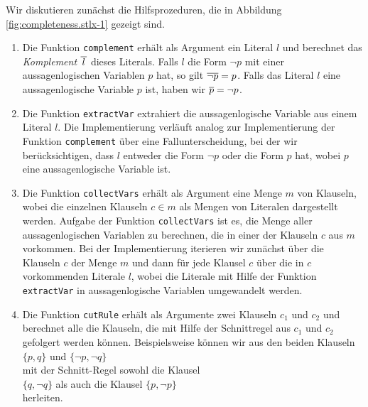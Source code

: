 Wir diskutieren zun\"{a}chst die Hilfsprozeduren, die in Abbildung \ref{fig:completeness.stlx-1} gezeigt
sind. 
\begin{enumerate}
\item Die Funktion \texttt{complement} erh\"{a}lt als Argument ein Literal $l$ und berechnet das
      \emph{\color{blue}Komplement} $\overline{\,l\,}$ dieses Literals.  Falls $l$ die Form $\neg p$ mit einer
      aussagenlogischen Variablen $p$ hat, so gilt $\overline{\neg p} = p$.   Falls das Literal
      $l$ eine aussagenlogische Variable $p$ ist, haben wir $\overline{p} = \neg p$.
\item Die Funktion \texttt{extractVar} extrahiert die aussagenlogische Variable aus einem Literal $l$.
      Die Implementierung verl\"{a}uft analog zur Implementierung der Funktion \texttt{complement} \"{u}ber eine
      Fallunterscheidung, bei der wir ber\"{u}cksichtigen, dass $l$ entweder die Form $\neg p$ oder die
      Form $p$ hat, wobei $p$ eine aussagenlogische Variable ist.
\item Die Funktion \texttt{collectVars} erh\"{a}lt als Argument eine Menge $m$ von Klauseln, wobei die
      einzelnen Klauseln $c \in m$ als Mengen von Literalen dargestellt werden.  Aufgabe der
      Funktion \texttt{collectVars} ist es, die Menge aller aussagenlogischen Variablen zu
      berechnen, die in einer der Klauseln $c$ aus $m$ vorkommen.  Bei der Implementierung iterieren
      wir zun\"{a}chst \"{u}ber die Klauseln $c$ der Menge $m$ und dann f\"{u}r jede Klausel $c$ \"{u}ber die in $c$
      vorkommenden Literale $l$, wobei die Literale mit Hilfe der Funktion \texttt{extractVar} in
      aussagenlogische Variablen umgewandelt werden.
\item Die Funktion \texttt{cutRule} erh\"{a}lt als Argumente zwei Klauseln $c_1$ und $c_2$ und berechnet
      alle die Klauseln, die mit Hilfe der Schnittregel aus $c_1$ und $c_2$ gefolgert werden
      k\"{o}nnen.  Beispielsweise k\"{o}nnen wir aus den beiden Klauseln
      \\[0.2cm]
      \hspace*{1.3cm}
      $\{ p, q \}$ \quad und \quad $\{ \neg p, \neg q \}$ 
      \\[0.2cm]
      mit der Schnitt-Regel sowohl die Klausel
      \\[0.2cm]
      \hspace*{1.3cm}
      $\{q, \neg q\}$ \quad als auch die Klausel \quad $\{p, \neg p \}$
      \\[0.2cm]
      herleiten.
\end{enumerate}

